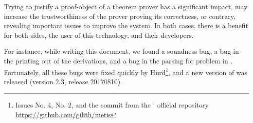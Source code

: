 \documentclass[../main.tex]{subfiles}
\begin{document}
Trying to justify a proof-object of a theorem prover has a
significant impact, may increase the trustworthiness of the prover
proving its correctness, or contrary, revealing important issues to
improve the system. In both cases, there is a benefit for both
sides, the user of this technology, and their developers.

For instance, while writing this document, we found a soundness bug,
a bug in the printing out of the \TSTP derivations, and a bug in the
parsing for \TPTP problem in \Metis. Fortunately, all these bugs
were fixed quickly by Hurd\footnote{Issues No. 4, No. 2, and the
commit  from the \Metis' official repository
\url{https://github.com/gilith/metis}}, and a new version of \Metis
was released (version 2.3, release 20170810).

\end{document}
